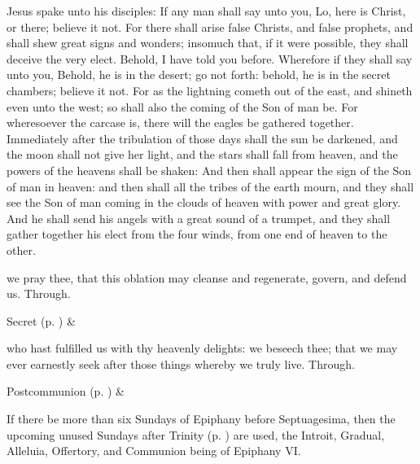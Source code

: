  Jesus spake unto his disciples: If any man shall say unto you, Lo, here is Christ, or there; believe it not. For there shall arise false Christs, and false prophets, and shall shew great signs and wonders; insomuch that, if it were possible, they shall deceive the very elect. Behold, I have told you before. Wherefore if they shall say unto you, Behold, he is in the desert; go not forth: behold, he is in the secret chambers; believe it not. For as the lightning cometh out of the east, and shineth even unto the west; so shall also the coming of the Son of man be. For wheresoever the carcase is, there will the eagles be gathered together. Immediately after the tribulation of those days shall the sun be darkened, and the moon shall not give her light, and the stars shall fall from heaven, and the powers of the heavens shall be shaken: And then shall appear the sign of the Son of man in heaven: and then shall all the tribes of the earth mourn, and they shall see the Son of man coming in the clouds of heaven with power and great glory. And he shall send his angels with a great sound of a trumpet, and they shall gather together his elect from the four winds, from one end of heaven to the other.


\secret
{} we pray thee, that this oblation may cleanse and regenerate, govern, and defend us. Through.


\begin{rubric}
     Secret  (p. \pageref{SPSaints}) \&  
\end{rubric}


\postcommunion
{} who hast fulfilled us with thy heavenly delights: we beseech thee; that we may ever earnestly seek after those things whereby we truly live. Through.
\begin{rubric}
     Postcommunion  (p. \pageref{SPSaints}) \&  
\end{rubric}
\begin{rubric}
    If there be more than six Sundays of Epiphany before Septuagesima, then the upcoming unused Sundays after Trinity (p. \pageref{trinity}) are used, the Introit, Gradual, Alleluia, Offertory, and Communion being of Epiphany VI.
\end{rubric}


